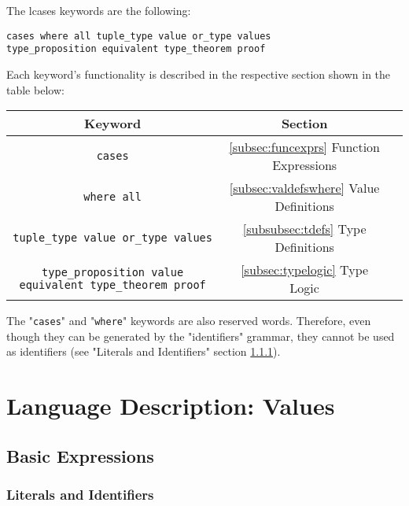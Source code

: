 \documentclass{article}
\begin{document}
The lcases keywords are the following:
\begin{verbatim}
cases where all tuple_type value or_type values
type_proposition equivalent type_theorem proof
\end{verbatim}
Each keyword's functionality is described in the respective section shown in the 
table below:

\begin{center}
\begin{tabular}{ |c|c|c| } 
\hline
Keyword & Section \\ 
\hline
\hline
\texttt{cases} & \ref{subsec:funcexprs} Function Expressions \\
\hline
\texttt{where all} & \ref{subsec:valdefswhere} Value Definitions \\
\hline
\texttt{tuple_type value or_type values} & \ref{subsubsec:tdefs} Type Definitions \\
\hline
\texttt{type_proposition value equivalent type_theorem proof} &
{\ref{subsec:typelogic} Type Logic} \\
\hline
\end{tabular}
\end{center}
The "\texttt{cases}" and "\texttt{where}" keywords are also
reserved words. Therefore, even though they can be generated by the
"identifiers" grammar, they cannot be used as identifiers (see "Literals and
Identifiers" section \ref{subsubsec:litsandidents}).

\section{Language Description: Values}

\subsection{Basic Expressions}

\subsubsection{Literals and Identifiers}
\label{subsubsec:litsandidents}
\end{document}
